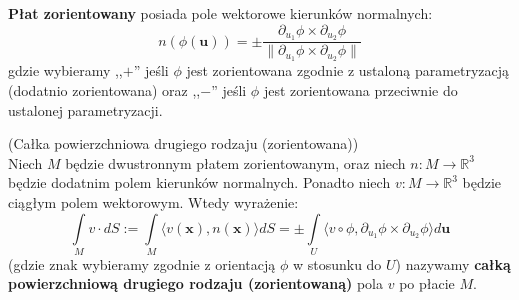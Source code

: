\begin{uwg}
	\textbf{Płat zorientowany} posiada pole wektorowe kierunków normalnych: $$n(\phi(\textbf{u}))=\pm\dfrac{\partial_{u_1}\phi\times\partial_{u_2}\phi}{\|\partial_{u_1}\phi\times\partial_{u_2}\phi\|}$$ gdzie wybieramy ,,$+$'' jeśli $\phi$ jest zorientowana zgodnie z ustaloną parametryzacją (dodatnio zorientowana) oraz ,,$-$'' jeśli $\phi$ jest zorientowana przeciwnie do ustalonej parametryzacji.
\end{uwg}

\begin{df}{(Całka powierzchniowa drugiego rodzaju (zorientowana))}\\
	Niech $M$ będzie dwustronnym płatem zorientowanym, oraz niech $n:M\rightarrow\mathbb{R}^3$ będzie dodatnim polem kierunków normalnych. Ponadto niech $v:M\rightarrow\mathbb{R}^3$ będzie ciągłym polem wektorowym. Wtedy wyrażenie: $$\int\limits_Mv\cdot dS:=\int\limits_M\langle v(\textbf{x}), n(\textbf{x})\rangle dS=\pm\int\limits_U\langle v\circ \phi,\partial_{u_1}\phi\times\partial_{u_2}\phi\rangle d\textbf{u}$$ (gdzie znak wybieramy zgodnie z orientacją $\phi$ w stosunku do $U$) nazywamy \textbf{całką powierzchniową drugiego rodzaju (zorientowaną)} pola $v$ po płacie $M$.
\end{df}

